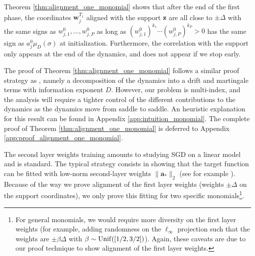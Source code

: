 \documentclass[11pt]{article}
\newcommand{\<}{\langle}
\renewcommand{\>}{\rangle}
\theoremstyle{definition}
\def\ba{{\boldsymbol a}}
\def\bw{{\boldsymbol w}}
\def\bz{{\boldsymbol z}}
\def\Unif{{\rm Unif}}
\def\Unif{{\sf Unif}}
\def\Unif{{\sf Unif}}
\def\bz{{\boldsymbol z}}
\def\bw{{\boldsymbol w}}
\def\ba{{\boldsymbol a}}
\def\Unif{{\rm Unif}}
\def\bz{{\boldsymbol z}}
\def\oT{\overline{T}}
\begin{document}
Theorem \ref{thm:alignment_one_monomial} shows that after the end of the first phase, the coordinates $\bw_j^{\oT_1}$ aligned with the support $\bz$ are all close to $\pm \Delta$ with the same signs as $w_{j,1}^0 , \ldots , w_{j,P}^0$ as long as $(w_{j,1}^0)^{k_1} \cdots (w_{j,P}^0)^{k_P} > 0$ has the same sign as $a_j^0 \mu_D (\sigma) $ at initialization. Furthermore, the correlation with the support only appears at the end of the dynamics, and does not appear if we stop early. 

The proof of Theorem \ref{thm:alignment_one_monomial} follows a similar proof strategy as \cite{arous2021online}, namely a decomposition of the dynamics into a drift and martingale terms with  information exponent $D$. However, our problem is multi-index, and the analysis will require a tighter control of the different contributions to the dynamics as the dynamics move from saddle to saddle. An heuristic explanation for this result can be found in Appendix \ref{app:intuition_monomial}. The complete proof of Theorem \ref{thm:alignment_one_monomial} is deferred to Appendix \ref{app:proof_alignment_one_monomial}. 


The second layer weights training amounts to studying SGD on a linear model and is standard. The typical strategy consists in showing that the target function can be fitted with low-norm second-layer weights $\| \ba_*\|_2$ (see for example \cite{daniely2020learning,barak2022hidden,damian2022neural,abbe2022merged}). Because of the way we prove alignment of the first layer weights (weights $\pm \Delta$ on the support coordinates), we only prove this fitting for two specific monomials\footnote{For general monomials, we would require more diversity on the first layer weights (for example, adding randomness on the $\ell_\infty$ projection such that the weights are $\pm \beta \Delta$ with $\beta \sim \Unif([1/2,3/2])$). Again, these caveats are due to our proof technique to show alignment of the first layer weights.}. 
\end{document}

